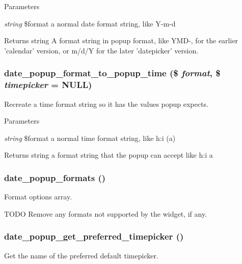 \begin{DoxyParams}{Parameters}
\item[{\em string}]\$format a normal date format string, like Y-\/m-\/d \end{DoxyParams}
\begin{DoxyReturn}{Returns}
string A format string in popup format, like YMD-\/, for the earlier 'calendar' version, or m/d/Y for the later 'datepicker' version. 
\end{DoxyReturn}
\hypertarget{date__popup_8module_a93e9f2dd0ee8f2a44b99a2258c709355}{
\subsubsection[{date\_\-popup\_\-format\_\-to\_\-popup\_\-time}]{\setlength{\rightskip}{0pt plus 5cm}date\_\-popup\_\-format\_\-to\_\-popup\_\-time (\$ {\em format}, \/  \$ {\em timepicker} = {\ttfamily NULL})}}
\label{date__popup_8module_a93e9f2dd0ee8f2a44b99a2258c709355}
Recreate a time format string so it has the values popup expects.


\begin{DoxyParams}{Parameters}
\item[{\em string}]\$format a normal time format string, like h:i (a) \end{DoxyParams}
\begin{DoxyReturn}{Returns}
string a format string that the popup can accept like h:i a 
\end{DoxyReturn}
\hypertarget{date__popup_8module_a7e2c02bedbfb8ff3d87b7e7151e72ba7}{
\subsubsection[{date\_\-popup\_\-formats}]{\setlength{\rightskip}{0pt plus 5cm}date\_\-popup\_\-formats ()}}
\label{date__popup_8module_a7e2c02bedbfb8ff3d87b7e7151e72ba7}
Format options array.

TODO Remove any formats not supported by the widget, if any. \hypertarget{date__popup_8module_a199bd599cff3bfafca2ba101347867e1}{
\subsubsection[{date\_\-popup\_\-get\_\-preferred\_\-timepicker}]{\setlength{\rightskip}{0pt plus 5cm}date\_\-popup\_\-get\_\-preferred\_\-timepicker ()}}
\label{date__popup_8module_a199bd599cff3bfafca2ba101347867e1}
Get the name of the preferred default timepicker.

